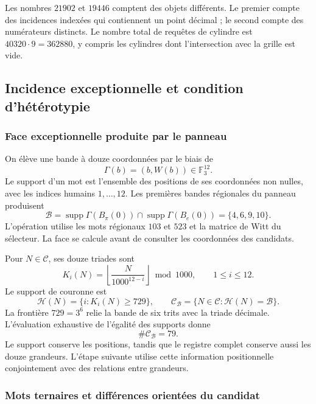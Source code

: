 Les nombres $21902$ et $19446$ comptent des objets différents. Le premier
compte des incidences indexées qui contiennent un point décimal ; le second
compte des numérateurs distincts. Le nombre total de requêtes de cylindre
est $40320\cdot9=362880$, y compris les cylindres dont l'intersection avec
la grille est vide.

\subsection{Incidence exceptionnelle et condition d'hétérotypie}

\subsubsection{Face exceptionnelle produite par le panneau}

On élève une bande à douze coordonnées par le biais de
\[
 \Gamma(b)=(b,W(b))\in\mathbb F_3^{12}.
\]
Le support d'un mot est l'ensemble des positions de ses coordonnées non nulles, avec les indices humains $1,\ldots,12$. Les premières bandes régionales du panneau produisent
\begin{equation}
 \mathcal B=\operatorname{supp}\Gamma(B_\pi(0))
          \cap\operatorname{supp}\Gamma(B_e(0))
          =\{4,6,9,10\}.
 \label{act21:eq:kdes-cara}
\end{equation}
L'opération utilise les mots régionaux $103$ et $523$ et la matrice de Witt du sélecteur. La face se calcule avant de consulter les coordonnées des candidats.

Pour $N\in\mathcal C$, ses douze triades sont
\begin{equation}
 K_i(N)=\left\lfloor\frac{N}{1000^{12-i}}\right\rfloor\bmod1000,
 \qquad1\leq i\leq12.
 \label{act21:eq:kdes-triadas}
\end{equation}
Le support de couronne est
\[
 \mathcal H(N)=\{i:K_i(N)\geq729\},
 \qquad
 \mathcal C_{\mathcal B}=\{N\in\mathcal C:\mathcal H(N)=\mathcal B\}.
\]
La frontière $729=3^6$ relie la bande de six trits avec la triade décimale. L'évaluation exhaustive de l'égalité des supports donne
\begin{equation}
 \#\mathcal C_{\mathcal B}=79.
 \label{act21:eq:kdes-79}
\end{equation}
Le support conserve les positions, tandis que le registre complet
conserve aussi les douze grandeurs. L'étape suivante utilise cette
information positionnelle conjointement avec des relations entre grandeurs.

\subsubsection{Mots ternaires et différences orientées du candidat}

